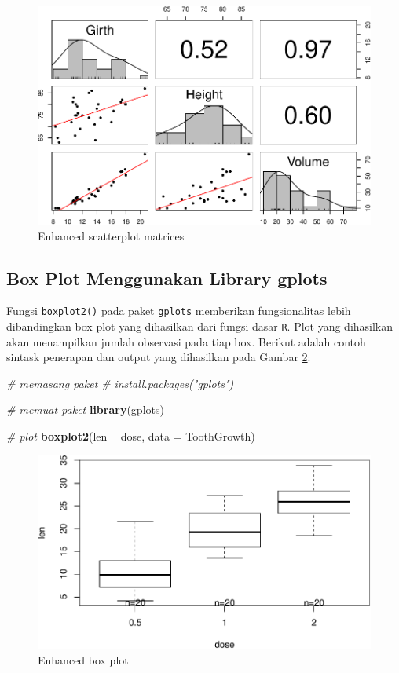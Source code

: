 \documentclass[]{book}
\newenvironment{Shaded}{\begin{snugshade}}{\end{snugshade}}
\newcommand{\KeywordTok}[1]{\textcolor[rgb]{0.13,0.29,0.53}{\textbf{#1}}}
\newcommand{\DataTypeTok}[1]{\textcolor[rgb]{0.13,0.29,0.53}{#1}}
\newcommand{\StringTok}[1]{\textcolor[rgb]{0.31,0.60,0.02}{#1}}
\newcommand{\CommentTok}[1]{\textcolor[rgb]{0.56,0.35,0.01}{\textit{#1}}}
\newcommand{\OperatorTok}[1]{\textcolor[rgb]{0.81,0.36,0.00}{\textbf{#1}}}
\newcommand{\NormalTok}[1]{#1}
\begin{document}
\begin{figure}

{\centering \includegraphics[width=0.7\linewidth]{EnvStat_files/figure-latex/psychscatter-1} 

}

\caption{Enhanced scatterplot matrices}\label{fig:psychscatter}
\end{figure}

\subsection{Box Plot Menggunakan Library
gplots}\label{box-plot-menggunakan-library-gplots}

Fungsi \texttt{boxplot2()} pada paket \texttt{gplots} memberikan
fungsionalitas lebih dibandingkan box plot yang dihasilkan dari fungsi
dasar \texttt{R}. Plot yang dihasilkan akan menampilkan jumlah observasi
pada tiap box. Berikut adalah contoh sintask penerapan dan output yang
dihasilkan pada Gambar \ref{fig:gplotsboxplot2}:

\begin{Shaded}
\begin{Highlighting}[]
\CommentTok{# memasang paket}
\CommentTok{# install.packages("gplots")}

\CommentTok{# memuat paket}
\KeywordTok{library}\NormalTok{(gplots)}

\CommentTok{# plot}
\KeywordTok{boxplot2}\NormalTok{(len }\OperatorTok{~}\StringTok{ }\NormalTok{dose, }\DataTypeTok{data =}\NormalTok{ ToothGrowth)}
\end{Highlighting}
\end{Shaded}

\begin{figure}

{\centering \includegraphics[width=0.7\linewidth]{EnvStat_files/figure-latex/gplotsboxplot2-1} 

}

\caption{Enhanced box plot}\label{fig:gplotsboxplot2}
\end{figure}
\end{document}
